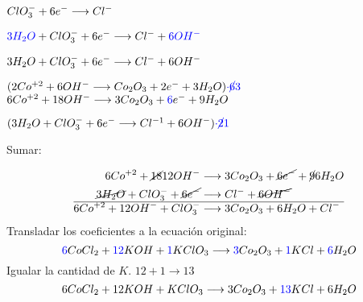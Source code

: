 \documentclass[../practica.root.tex]{subfiles}
\begin{document}
\begin{enumerate}
\begin{enumerate}
\begin{itemize}
\begin{multicols}{2}
				                  \columnbreak

				                  $ClO_3^- + 6 e^- \longrightarrow{} Cl^-$


				                  $\textcolor{blue}{3H_2O} + ClO_3^- + 6 e^- \longrightarrow{} Cl^- + \textcolor{blue}{6OH^-}$


				                  $3 H_2O + ClO_3^- + 6 e^- \longrightarrow{} Cl^- + 6 OH^-$
			                  \end{multicols}
			                  \begin{multicols}{2}
				                  $(2 Co^{+2} + 6 OH^- \longrightarrow{} Co_2O_3 + 2 e^- + 3 H_2O)\textcolor{blue}{\cdot\cancel{6}{3}}$ \\
				                  $6 Co^{+2} + 18 OH^- \longrightarrow{} 3 Co_2O_3 + \textcolor{blue}{6} e^- + 9 H_2O$

				                  \columnbreak

				                  $(3 H_2O + ClO_3^- + 6 e^- \longrightarrow{} Cl^{-1} + 6 OH^-)\textcolor{blue}{\cdot\cancel{2}{1}}$
			                  \end{multicols}
			                  Sumar:

			                  \begin{align*}
				                  6 Co^{+2} + \cancel{18}{12} OH^-           & \longrightarrow{}  3 Co_2O_3 + \cancel{6 e^-} + \cancel{9}{6} H_2O \\
				                  \cancel{3 H_2O} + ClO_3^- + \cancel{6 e^-} & \longrightarrow{} Cl^- + \cancel{6 OH^-}                           \\
				                  \hline
				                  6 Co^{+2} + 12 OH^- + ClO_3^-              & \longrightarrow{} 3 Co_2O_3 + 6 H_2O + Cl^-
			                  \end{align*}
			                  Transladar los coeficientes a la ecuación original: \\
			                  \[ \textcolor{blue}{6} CoCl_2 + \textcolor{blue}{12} KOH + \textcolor{blue}{1} KClO_3 \longrightarrow{} \textcolor{blue}{3} Co_2O_3 + \textcolor{blue}{1} KCl + \textcolor{blue}{6} H_2O \]
			                  Igualar la cantidad de $K$. $12 + 1 \rightarrow 13$ \\
			                  \[ 6 CoCl_2 + 12 KOH + KClO_3 \longrightarrow{} 3 Co_2O_3 + \textcolor{blue}{13} KCl + 6 H_2O \]
		            \end{itemize}
	      \end{enumerate}


\end{enumerate}
\end{document}
